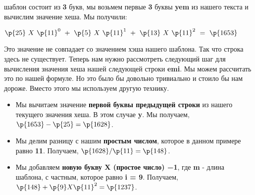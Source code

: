 шаблон состоит из \textbf{3} букв, мы возьмем первые \textbf{3} буквы \textbf{yem} из нашего текста и вычислим
значение хеша. Мы получили:
\vspace{\baselineskip}
\begin{tcolorbox}
$\p{25}~ X~ \p{11}^0~+~\p{5}~ X~ \p{11}^1~+~\p{13}~ X~ \p{11}^2~=~\p{1653}$
\end{tcolorbox}
\vspace{\baselineskip}
Это значение не совпадает со значением хэша нашего шаблона. Так что строка здесь не
существует. Теперь нам нужно рассмотреть следующий шаг для вычисления значения хеша
нашей следующей строки \textbf{emi}. Мы можем рассчитать это по нашей формуле. Но это было бы
довольно тривиально и стоило бы нам дороже. Вместо этого мы используем другую технику.

\vspace{\baselineskip}
\begin{itemize}
    \item Мы вычитаем значение \textbf{первой буквы предыдущей строки} из нашего текущего значения хеша. В этом случае \textbf{y}. Мы получаем, $\p{1653} - \p{25} = \p{1628}$.
    \item Мы делим разницу с нашим \textbf{простым числом}, которое в данном примере равно \textbf{11}. Получаем, $\p{1628}/\p{11} = \p{148}$.
    \item Мы добавляем \textbf{новую букву X (простое число) −1}, где \textbf{m} - длина шаблона, с частным, которое равно \textbf{i = 9}. Получаем, $\p{148} + \p{9} X \p{11}^2 = \p{1237}$.
\end{itemize}
\vspace{\baselineskip}

